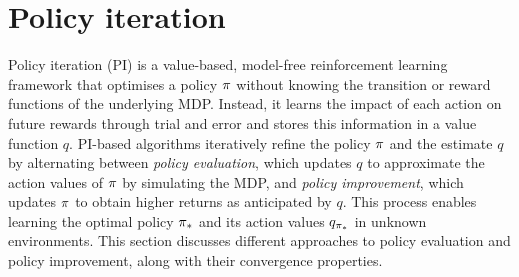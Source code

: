 \vspace{-0.25cm}
\section{Policy iteration}
\vspace{-0.25cm}

Policy iteration (PI) is a value-based, model-free reinforcement learning framework that optimises a policy $\pi$ without knowing the transition or reward functions of the underlying MDP.
Instead, it learns the
impact of each action on future rewards 
through trial and error and stores this information in a value function $q$.
PI-based algorithms iteratively refine the policy $\pi$ and the estimate $q$ by alternating between
\textit{policy evaluation}, which updates $q$ to approximate the action values of $\pi$ by simulating the MDP,
and \textit{policy improvement}, which updates $\pi$ to obtain higher returns as anticipated by $q$.
This process enables learning the optimal policy ${\pi}_*$ and its action values $q_{{\pi}_*}$ in unknown environments.
This section discusses different approaches to policy evaluation and policy improvement, along with their convergence properties.








